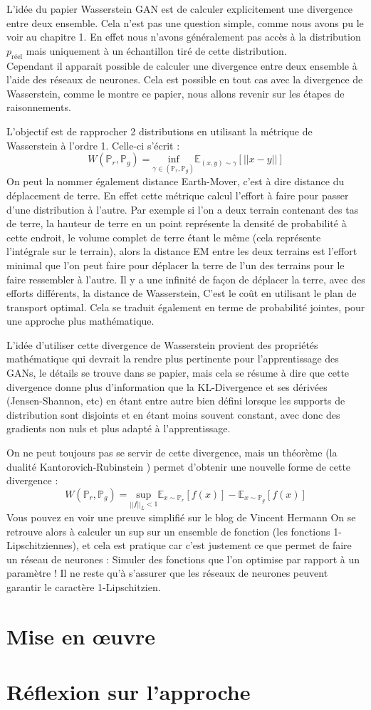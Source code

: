 L'idée du papier Wasserstein GAN est de calculer explicitement une divergence entre deux ensemble. Cela n'est pas une question simple, comme nous avons pu le voir au chapitre 1. En effet nous n'avons généralement pas accès à la distribution $p_{\text{réel}}$ mais uniquement à un échantillon tiré de cette distribution. \\ Cependant il apparait possible de calculer une divergence entre deux ensemble à l'aide des réseaux de neurones. Cela est possible en tout cas avec la divergence de Wasserstein, comme le montre ce papier, nous allons revenir sur les étapes de raisonnements.

L'objectif est de rapprocher 2 distributions en utilisant la métrique de Wasserstein à l'ordre 1. Celle-ci s'écrit :
\[
W(\mathbb{P}_r, \mathbb{P}_g)= \underset{\gamma \in (\mathbb{P}_r, \mathbb{P}_g)}{\text{inf}} \mathbb{E}_{(x,y)\sim\gamma} \left[ ||x-y||\right]
\]
On peut la nommer également distance Earth-Mover, c'est à dire distance du déplacement de terre. En effet cette métrique calcul l'effort à faire pour passer d'une distribution à l'autre. Par exemple si l'on a deux terrain contenant des tas de terre, la hauteur de terre en un point représente la densité de probabilité à cette endroit, le volume complet de terre étant le même (cela représente l'intégrale sur le terrain), alors la distance EM entre les deux terrains est l'effort minimal que l'on peut faire pour déplacer la terre de l'un des terrains pour le faire ressembler à l'autre. Il y a une infinité de façon de déplacer la terre, avec des efforts différents, la distance de Wasserstein, C'est le coût en utilisant le plan de transport optimal. Cela se traduit également en terme de probabilité jointes, pour une approche plus mathématique. 

L'idée d'utiliser cette divergence de Wasserstein provient des propriétés mathématique qui devrait la rendre plus pertinente pour l'apprentissage des GANs, le détails se trouve dans se papier, mais cela se résume à dire que cette divergence donne plus d'information que la KL-Divergence et ses dérivées (Jensen-Shannon, etc) en étant entre autre bien défini lorsque les supports de distribution sont disjoints et en étant moins souvent constant, avec donc des gradients non nuls et plus adapté à l'apprentissage.

On ne peut toujours pas se servir de cette divergence, mais un théorème (la dualité Kantorovich-Rubinstein \cite{optimal-transport}) permet d'obtenir une nouvelle forme de cette divergence :
\[
W(\mathbb{P}_r, \mathbb{P}_g) = \underset{||f||_L<1}{\text{sup}}\mathbb{E}_{x\sim\mathbb{P}_r}\left[f(x)\right] - \mathbb{E}_{x\sim\mathbb{P}_g}\left[f(x)\right]
\]
Vous pouvez en voir une preuve simplifié sur le blog de Vincent Hermann \cite{preuve-wgan}
On se retrouve alors à calculer un sup sur un ensemble de fonction (les fonctions 1-Lipschitziennes), et cela est pratique car c'est justement ce que permet de faire un réseau de neurones : Simuler des fonctions que l'on optimise par rapport à un paramètre ! Il ne reste qu'à s'assurer que les réseaux de neurones peuvent garantir le caractère 1-Lipschitzien. 

\section{Mise en œuvre}

\section{Réflexion sur l'approche}